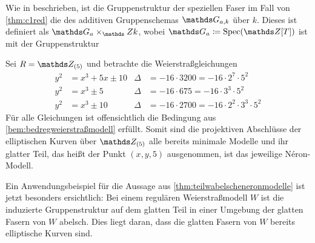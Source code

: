 Wie in \cite[Chapter~1.5]{neron} beschrieben, ist die
Gruppenstruktur der speziellen Faser im Fall von \ref{thm:c1red} die
des additiven Gruppenschemas $\G_{a,k}$ über $k$. Dieses ist definiert
als $\G_{a}\times_\Z k$, wobei $\G_{a}\coloneqq\Spec(\Z[T])$ ist mit
der Gruppenstruktur
\begin{center}
\end{center}
    
\begin{Beispiel}
  Sei $R=\Z_{(5)}$ und betrachte die Weierstraßgleichungen
  \begin{align*}
    y^2&=x^3+5x\pm 10
    & \Delta&=-16\cdot3200=-16\cdot2^7\cdot5^2\\
    y^2&=x^3\pm 5
    & \Delta&=-16\cdot675=-16\cdot3^3\cdot5^2\\
    y^2&=x^3\pm 10
    & \Delta&=-16\cdot2700=-16\cdot2^2\cdot3^3\cdot5^2
  \end{align*}
  Für alle Gleichungen ist offensichtlich die Bedingung aus
  \ref{bem:bedregweierstraßmodell} erfüllt.
  Somit sind die projektiven Abschlüsse der elliptischen Kurven über
  $\Z_{(5)}$ alle bereits minimale Modelle und ihr glatter Teil,
  das heißt der Punkt $(x,y,5)$ ausgenommen, ist das jeweilige
  Néron-Modell.
\end{Beispiel}

\begin{Beispiel}
  Ein Anwendungsbeispiel für die Aussage aus
  \ref{thm:teilwabelscheneronmodelle} ist jetzt besonders ersichtlich:
  Bei einem regulären Weierstraßmodell $W$ ist die induzierte
  Gruppenstruktur auf dem glatten Teil in einer Umgebung der glatten
  Fasern von $W$ abelsch.
  Dies liegt daran, dass die glatten Fasern von $W$ bereits
  elliptische Kurven sind.
\end{Beispiel}

